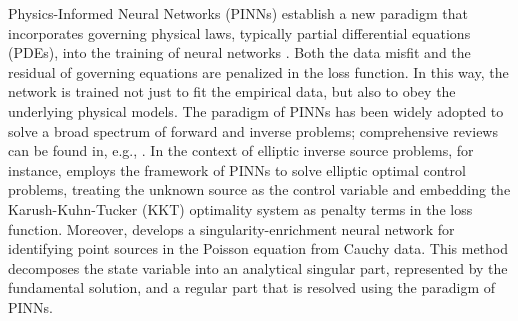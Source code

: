 \documentclass[final,hidelinks,onefignum,onetabnum]{siamart251216}
\begin{document}
Physics-Informed Neural Networks (PINNs) establish a new paradigm that incorporates governing physical laws, typically partial differential equations (PDEs), into the training of neural networks \cite{raiperkar19}. Both the data misfit and the residual of governing equations are penalized in the loss function. In this way, the network is trained not just to fit the empirical data, but also to obey the underlying physical models. The paradigm of PINNs has been widely adopted to solve a broad spectrum of forward and inverse problems; comprehensive reviews can be found in, e.g., \cite{cuodietc22,nganinetc23}. In the context of elliptic inverse source problems, for instance, \cite{daijinsauzho25} employs the framework of PINNs to solve elliptic optimal control problems, treating the unknown source as the control variable and embedding the Karush-Kuhn-Tucker (KKT) optimality system as penalty terms in the loss function. Moreover, \cite{hujinzho26} develops a singularity-enrichment neural network for identifying point sources in the Poisson equation from Cauchy data. This method decomposes the state variable into an analytical singular part, represented by the fundamental solution, and a regular part that is resolved using the paradigm of PINNs.
\end{document}
